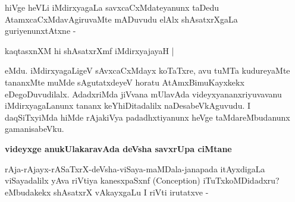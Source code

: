 \noindent
hiVge heVLi iMdirxyagaLa savxcaCxMdateyanunx taDedu AtamxcaCxMdavAgiruvaMte mADuvudu elAlx shAsatxrXgaLa guriyenunxtAtxne -

\begin{shloka}
kaqtasxnXM hi shAsatxrXmf iMdirxyajayaH |\label{96}
\end{shloka}

\noindent
eMdu. iMdirxyagaLigeV sAvxcaCxMdayx koTaTxre, avu tuMTa kudureyaMte tananxMte muMde sAgutatxdeyeV horatu AtAmxBimuKayxkekx eDegoDuvudilalx. AdadxriMda jiVvana mUlavAda videyxyananxriyuvavanu iMdirxyagaLanunx tananx keYhiDitadalilx naDesabeVkAguvudu. I daqSiTxyiMda hiMde rAjakiVya padadhxtiyanunx heVge taMdareMbudanunx gamanisabeVku.

{\bigskip
\noindent
{\large\bf videyxge anukUlakaravAda deVsha savxrUpa ciMtane}}
\medskip

\noindent
rAja-rAjayx-rASaTxrX-deVsha-viSaya-maMDala-janapada itAyxdigaLa viSayadalilx yAva riVtiya kanesxpaSxnf ({\rm Conception}) iTuTxkoMDidadxru? eMbudakekx shAsatxrX vAkayxgaLu I riVti irutatxve -

